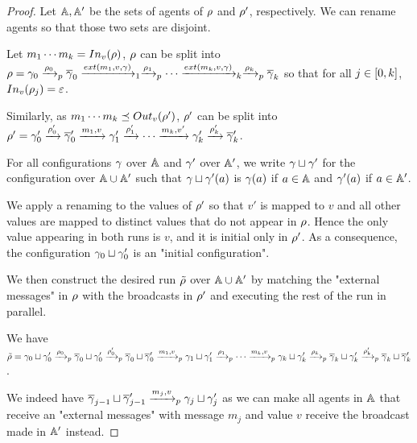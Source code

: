 \begin{proof}
	Let $\mathbb{A}, \mathbb{A}'$ be the sets of agents of $\rho$ and $\rho'$, respectively.
	We can rename agents so that those two sets are disjoint.
	
	Let $m_1 \cdots m_k = \vinput{v}{\run}$, $\rho$ can be split into $\run = \config_0 \pstep{\run_0} \overline{\config}_0 \extbr{m_1,v} \config_{1} \pstep{\run_1} \cdots \extbr{m_k,v} \config_{k} \pstep{\run_k} \overline{\config}_k$ so that for all $j\in [0,k]$, $\vinput{v}{\run_j} = \varepsilon$.
	
	Similarly, as $m_1\cdots m_k \subword \voutput{v}{\run'}$, $\rho'$ can be split into $\rho' = \gamma'_0 \xrightarrow{\rho'_0} \overline{\gamma}'_0 \xrightarrow{m_1, v} \gamma'_{1} \xrightarrow{\rho'_1} \cdots \xrightarrow{m_k,v'} \gamma'_{k} \xrightarrow{\rho'_k} \overline{\gamma}'_k$.
	
	For all configurations $\gamma$ over $\mathbb{A}$ and $\gamma'$ over $\mathbb{A}'$, we write $\gamma \sqcup \gamma'$ for the configuration over $\mathbb{A} \cup \mathbb{A}'$ such that $\gamma \sqcup \gamma'(a)$ is $\gamma(a)$ if $a \in \mathbb{A}$ and $\gamma'(a)$ if $a \in \mathbb{A}'$.
	
	We apply a renaming to the values of $\rho'$ so that $v'$ is mapped to $v$ and all other values are mapped to distinct values that do not appear in $\rho$.
	Hence the only value appearing in both runs is $v$, and it is initial only in $\rho'$. As a consequence, the configuration $\gamma_0 \sqcup \gamma'_0$ is an "initial configuration".
	
	We then construct the desired run $\Tilde{\rho}$ over $\mathbb{A} \cup \mathbb{A}'$ by matching the "external messages" in $\rho$ with the broadcasts in $\rho'$ and executing the rest of the run in parallel.
	
	We have $\Tilde{\rho} = \gamma_0 \sqcup \gamma'_0 \xrightarrow{\rho_0}_{p} \overline{\gamma}_0 \sqcup \gamma'_0 \xrightarrow{\rho'_0}_{p} \overline{\gamma}_0 \sqcup \overline{\gamma}'_0 \xrightarrow{m_1, v}_{p} \gamma_{1} \sqcup \gamma'_1 \xrightarrow{\rho_1}_{p} \cdots \xrightarrow{m_k,v}_{p} \gamma_{k}  \sqcup \gamma'_{k} \xrightarrow{\rho_k}_{p}  \overline{\gamma}_k \sqcup \gamma'_k \xrightarrow{\rho'_k}_{p} \overline{\gamma}_k \sqcup \overline{\gamma}'_k$.
	
	We indeed have $\overline{\gamma}_{j-1} \sqcup \overline{\gamma}'_{j-1} \xrightarrow{m_j, v}_{p} \gamma_{j} \sqcup \gamma'_j$ as we can make all agents in $\mathbb{A}$ that receive an "external messages" with message $m_j$ and value $v$ receive the broadcast made in $\mathbb{A}'$ instead.
	

\end{proof}
